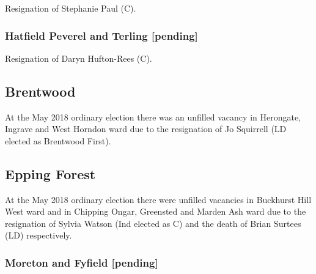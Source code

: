 \documentclass[a4paper,openany]{book}
\begin{document}
\begin{resultsiii}

Resignation of Stephanie Paul (C).

\subsubsection*{Hatfield Peverel and Terling \hspace*{\fill}\nolinebreak[1]%
\enspace\hspace*{\fill}
[pending]}


Resignation of Daryn Hufton-Rees (C).

\subsection*{Brentwood}

At the May 2018 ordinary election there was an unfilled vacancy in Herongate, Ingrave and West Horndon ward due to the resignation of Jo Squirrell (LD elected as Brentwood First).

\subsection*{Epping Forest}

At the May 2018 ordinary election there were unfilled vacancies in Buckhurst Hill West ward and in Chipping Ongar, Greensted and Marden Ash ward due to the resignation of Sylvia Watson (Ind elected as C) and the death of Brian Surtees (LD) respectively.

\subsubsection*{Moreton and Fyfield \hspace*{\fill}\nolinebreak[1]%
\enspace\hspace*{\fill}
[pending]}



\end{resultsiii}
\end{document}
